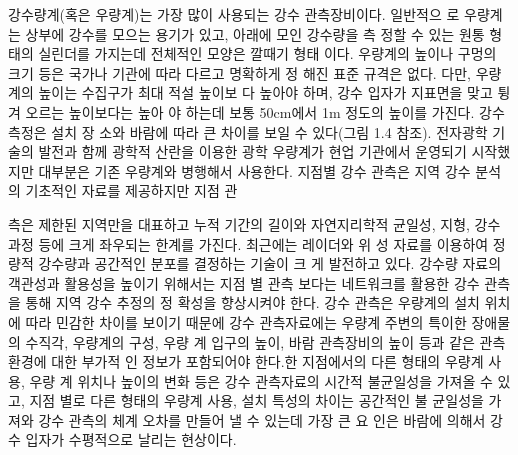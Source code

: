강수량계(혹은 우량계)는 가장 많이 사용되는 강수 관측장비이다. 일반적으
로 우량계는 상부에 강수를 모으는 용기가 있고, 아래에 모인 강수량을 측
정할 수 있는 원통 형태의 실린더를 가지는데 전체적인 모양은 깔때기 형태
이다.
우량계의 높이나 구멍의 크기 등은 국가나 기관에 따라 다르고 명확하게 정
해진 표준 규격은 없다. 다만, 우량계의 높이는 수집구가 최대 적설 높이보
다 높아야 하며, 강수 입자가 지표면을 맞고 튕겨 오르는 높이보다는 높아
야 하는데 보통 50cm에서 1m 정도의 높이를 가진다. 강수 측정은 설치 장
소와 바람에 따라 큰 차이를 보일 수 있다(그림 1.4 참조). 전자광학 기술의
발전과 함께 광학적 산란을 이용한 광학 우량계가 현업 기관에서 운영되기
시작했지만 대부분은 기존 우량계와 병행해서 사용한다.
지점별 강수 관측은 지역 강수 분석의 기초적인 자료를 제공하지만 지점 관

측은 제한된 지역만을 대표하고 누적 기간의 길이와 자연지리학적 균일성,
지형, 강수 과정 등에 크게 좌우되는 한계를 가진다. 최근에는 레이더와 위
성 자료를 이용하여 정량적 강수량과 공간적인 분포를 결정하는 기술이 크
게 발전하고 있다. 강수량 자료의 객관성과 활용성을 높이기 위해서는 지점
별 관측 보다는 네트워크를 활용한 강수 관측을 통해 지역 강수 추정의 정
확성을 향상시켜야 한다.
강수 관측은 우량계의 설치 위치에 따라 민감한 차이를 보이기 때문에 강수
관측자료에는 우량계 주변의 특이한 장애물의 수직각, 우량계의 구성, 우량
계 입구의 높이, 바람 관측장비의 높이 등과 같은 관측 환경에 대한 부가적
인 정보가 포함되어야 한다.한 지점에서의 다른 형태의 우량계 사용, 우량
계 위치나 높이의 변화 등은 강수 관측자료의 시간적 불균일성을 가져올 수
있고, 지점 별로 다른 형태의 우량계 사용, 설치 특성의 차이는 공간적인 불
균일성을 가져와 강수 관측의 체계 오차를 만들어 낼 수 있는데 가장 큰 요
인은 바람에 의해서 강수 입자가 수평적으로 날리는 현상이다.

